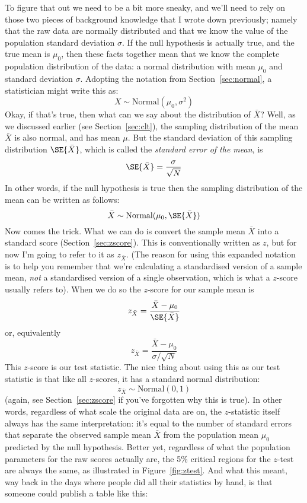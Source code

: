 To figure that out we need to be a bit more sneaky, and we'll need to rely on those two pieces of background knowledge that I wrote down previously; namely that the raw data are normally distributed and that we know the value of the population standard deviation $\sigma$. If the null hypothesis is actually true, and the true mean is $\mu_0$, then these facts together mean that we know the complete population distribution of the data: a normal distribution with mean $\mu_0$ and standard deviation $\sigma$. Adopting the notation from Section~\ref{sec:normal}, a statistician might write this as:
$$
X \sim \mbox{Normal}(\mu_0,\sigma^2)
$$
Okay, if that's true, then what can we say about the distribution of $\bar{X}$? Well, as we discussed earlier (see Section~\ref{sec:clt}), the sampling distribution of the mean $\bar{X}$ is also normal, and has mean $\mu$. But the standard deviation of this sampling distribution $\SE{\bar{X}}$, which is called the {\it standard error of the mean}, is
$$
\SE{\bar{X}} = \frac{\sigma}{\sqrt{N}}
$$
In other words, if the null hypothesis is true then the sampling distribution of the mean can be written as follows:
$$
\bar{X} \sim \mbox{Normal}(\mu_0,\SE{\bar{X}})
$$
Now comes the trick. What we can do is convert the sample mean $\bar{X}$ into a standard score (Section~\ref{sec:zscore}). This is conventionally written as $z$, but for now I'm going to refer to it as $z_{\bar{X}}$. (The reason for using this expanded notation is to help you remember that we're calculating a  standardised version of a sample mean, {\it not} a standardised version of a single observation, which is what a $z$-score usually refers to). When we do so the $z$-score for our sample mean is 
$$
z_{\bar{X}} = \frac{\bar{X} - \mu_0}{\SE{\bar{X}}}
$$
or, equivalently
$$
z_{\bar{X}} =  \frac{\bar{X} - \mu_0}{\sigma / \sqrt{N}}
$$
This $z$-score is our test statistic. The nice thing about using this as our test statistic is that like all $z$-scores, it has a standard normal distribution:
$$
z_{\bar{X}} \sim \mbox{Normal}(0,1)
$$
(again, see Section~\ref{sec:zscore} if you've forgotten why this is true). In other words, regardless of what scale the original data are on, the $z$-statistic itself always has the same interpretation: it's equal to the number of standard errors that separate the observed sample mean $\bar{X}$ from the population mean $\mu_0$ predicted by the null hypothesis. Better yet, regardless of what the population parameters for the raw scores actually are, the 5\% critical regions for the $z$-test are always the same, as illustrated in Figure~\ref{fig:ztest}. And what this meant, way back in the days where people did all their statistics by hand, is that someone could publish a table like this:
